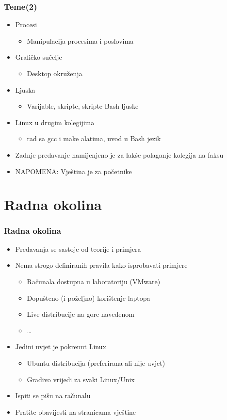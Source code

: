 \documentclass{beamer}
\begin{document}
\begin{frame}[t]
\frametitle{Teme(2)}
\begin{itemize}
	\item Procesi
	\begin{itemize}
		\item Manipulacija procesima i poslovima
	\end{itemize}
	\item Grafičko sučelje
	\begin{itemize}
		\item Desktop okruženja
	\end{itemize}
	\item Ljuska
	\begin{itemize}
		\item Varijable, skripte, skripte Bash ljuske 
	\end{itemize}
	\item Linux u drugim kolegijima
	\begin{itemize}
		\item rad sa gcc i make alatima, uvod u Bash jezik
	\end{itemize}
	\item Zadnje predavanje namijenjeno je za lakše polaganje kolegija na faksu
	\item NAPOMENA: Vještina je za početnike
\end{itemize}
\end{frame}

\section{Radna okolina}
\begin{frame}[t]
\frametitle{Radna okolina}
\begin{itemize}
	\item Predavanja se sastoje od teorije i primjera
	\item Nema strogo definiranih pravila kako isprobavati primjere
	\begin{itemize}
		\item Računala dostupna u laboratoriju (VMware)
		\item Dopušteno (i poželjno) korištenje laptopa
		\item Live distribucije na gore navedenom
		\item \ldots
	\end{itemize} 
	\item Jedini uvjet je pokrenut Linux
	\begin{itemize}
		\item Ubuntu distribucija (preferirana ali nije uvjet)
		\item Gradivo vrijedi za svaki Linux/Unix
	\end{itemize}
	\item Ispiti se pišu na računalu
	\item Pratite obavijesti na stranicama vještine
\end{itemize}
\end{frame}
\end{document}
